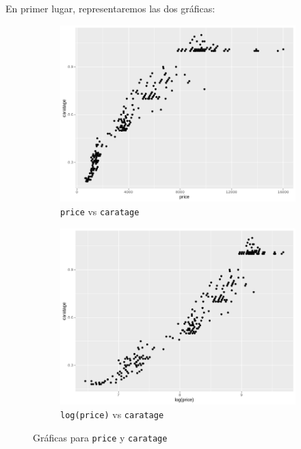 \documentclass[a4paper, 9pt]{article}
\begin{document}
En primer lugar, representaremos las dos gráficas:

\begin{figure}[h!]
  \centering
  \begin{subfigure}[b]{0.4\linewidth}
    \includegraphics[width=\linewidth]{report/images/question-1/price.png}
    \caption{\texttt{price} vs \texttt{caratage}}
  \end{subfigure}
  \begin{subfigure}[b]{0.4\linewidth}
    \includegraphics[width=\linewidth]{report/images/question-1/log(price).png}
    \caption{\texttt{log(price)} vs \texttt{caratage}}
  \end{subfigure}
  \caption{Gráficas para \texttt{price} y \texttt{caratage}}
  \label{fig:coffee}
\end{figure}
\end{document}
